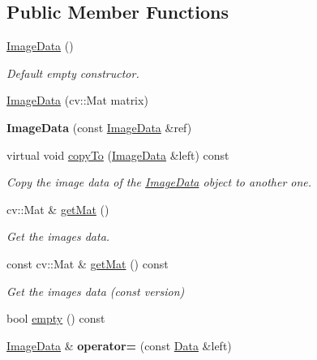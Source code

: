 \subsection*{Public Member Functions}
\begin{DoxyCompactItemize}
\item 
\mbox{\label{classfilter_1_1data_1_1_image_data_abb536d27922733a27037118802ab6191}} 
\hyperlink{classfilter_1_1data_1_1_image_data_abb536d27922733a27037118802ab6191}{Image\+Data} ()
\begin{DoxyCompactList}\small\item\em Default empty constructor. \end{DoxyCompactList}\item 
\hyperlink{classfilter_1_1data_1_1_image_data_ae34694d9ed284c8c85d4a67a52f09f12}{Image\+Data} (cv\+::\+Mat matrix)
\item 
\mbox{\label{classfilter_1_1data_1_1_image_data_ad62a19517fe97ec50c3cc55b30c7096f}} 
{\bfseries Image\+Data} (const \hyperlink{classfilter_1_1data_1_1_image_data}{Image\+Data} \&ref)
\item 
virtual void \hyperlink{classfilter_1_1data_1_1_image_data_ab035bfe80f8f6a6470046eb15fad7dfb}{copy\+To} (\hyperlink{classfilter_1_1data_1_1_image_data}{Image\+Data} \&left) const
\begin{DoxyCompactList}\small\item\em Copy the image data of the \hyperlink{classfilter_1_1data_1_1_image_data}{Image\+Data} object to another one. \end{DoxyCompactList}\item 
cv\+::\+Mat \& \hyperlink{classfilter_1_1data_1_1_image_data_aed944725082cbf0ab8def1af23612917}{get\+Mat} ()
\begin{DoxyCompactList}\small\item\em Get the image\textquotesingle{}s data. \end{DoxyCompactList}\item 
const cv\+::\+Mat \& \hyperlink{classfilter_1_1data_1_1_image_data_abccbb6bc292443ba7772febadd6e4884}{get\+Mat} () const
\begin{DoxyCompactList}\small\item\em Get the image\textquotesingle{}s data (const version) \end{DoxyCompactList}\item 
bool \hyperlink{classfilter_1_1data_1_1_image_data_aa2aa6922b9cad5746a16a66e15665717}{empty} () const
\item 
\mbox{\label{classfilter_1_1data_1_1_image_data_a98f56c3e6c8738b72c91c0a082ae74ef}} 
\hyperlink{classfilter_1_1data_1_1_image_data}{Image\+Data} \& {\bfseries operator=} (const \hyperlink{classfilter_1_1data_1_1_data}{Data} \&left)
\end{DoxyCompactItemize}
